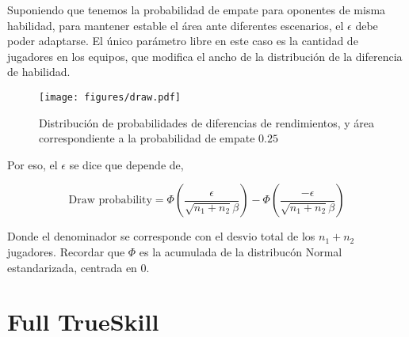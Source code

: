 \documentclass[article]{jss}
\begin{document}
\vspace{0.3cm}

Suponiendo que tenemos la probabilidad de empate para oponentes de misma habilidad, para mantener estable el \'area ante diferentes escenarios, el $\epsilon$ debe poder adaptarse.
El \'unico par\'ametro libre en este caso es la cantidad de jugadores en los equipos, que modifica el ancho de la distribuci\'on de la diferencia de habilidad.

\begin{figure}[H]
\centering
  \texttt{[image: figures/draw.pdf]}
  \caption{Distribuci\'on de probabilidades de diferencias de rendimientos, y \'area correspondiente a la probabilidad de empate $0.25$}
  \label{fig:draw}
\end{figure}

Por eso, el $\epsilon$ se dice que depende de, 

\begin{equation}
 \text{Draw probability} = \Phi(\frac{\epsilon}{\sqrt{n_1+n_2}\beta}) - \Phi(\frac{-\epsilon}{\sqrt{n_1+n_2}\beta})
\end{equation}

Donde el denominador se corresponde con el desvio total de los $n_1 + n_2$ jugadores.
Recordar que $\Phi$ es la acumulada de la distribuc\'on Normal estandarizada, centrada en 0. 


 
 
 
 
 
 










\section{Full TrueSkill}
\end{document}
